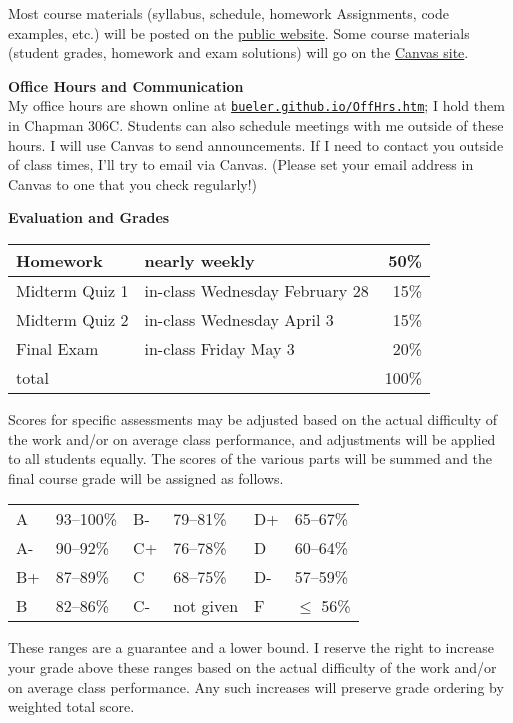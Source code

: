 \documentclass[12pt]{article}
\renewcommand{\emph}[1]{\textsf{\textbf{#1}}}
\newcommand{\localhead}[1]{\par\smallskip\textbf{#1} \smallskip\nobreak\\}%
\def\heading#1{\localhead{\large\emph{#1}}}
\begin{document}
Most course materials (syllabus, schedule, homework Assignments, code examples, etc.) will be posted on the \href{https://bueler.github.io/fa/}{public website}.  Some course materials (student grades, homework and exam solutions) will go on the \href{https://canvas.alaska.edu/courses/18441}{Canvas site}.


\clearpage\newpage
\phantom{foo}
\heading{Office Hours and Communication}
My office hours are shown online at \href{http://bueler.github.io/OffHrs.htm}{\texttt{bueler.github.io/OffHrs.htm}}; I hold them in Chapman 306C.  Students can also schedule meetings with me outside of these hours.  I will use Canvas to send announcements.  If I need to contact you outside of class times, I'll try to email via Canvas.  (Please set your email address in Canvas to one that you check regularly!)


\heading{Evaluation and Grades}
\vskip -10pt

\begin{tabular}{|l|l|r|}
\hline
Homework & nearly weekly & 50\% \\
\hline
Midterm Quiz 1 & in-class Wednesday February 28 & 15\%  \\
\hline
Midterm Quiz 2 & in-class Wednesday April 3 & 15\%  \\
\hline
Final Exam     & in-class Friday May 3 & 20\% \\
\hline
total & & 100\% \\
\hline
\end{tabular}

Scores for specific assessments may be adjusted based on the actual difficulty of the work and/or on average class performance, and adjustments will be applied to all students equally.  The scores of the various parts will be summed and the final course grade will be assigned as follows.

\begin{tabular}{llllll}
A  & 93--100\% & B- & 79--81\%  & D+ & 65--67\%  \\
A- & 90--92\%  & C+ & 76--78\%  & D  & 60--64\%  \\
B+ & 87--89\%  & C  & 68--75\%  & D- & 57--59\%  \\
B  & 82--86\%  & C- & not given & F  & $\le$ 56\%
\end{tabular}

These ranges are a guarantee and a lower bound.  I reserve the right to increase your grade above these ranges based on the actual difficulty of the work and/or on average class performance.  Any such increases will preserve grade ordering by weighted total score.
\end{document}
